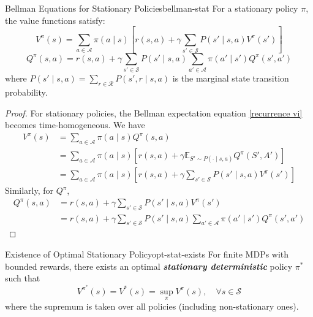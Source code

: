\documentclass[a4paper, 11pt]{article}
\numberwithin{equation}{section}
\theoremstyle{plain}
\theoremstyle{definition}
\newcommand{\E}{{\mathbb E}}
\newcommand{\1}{{\mathbbm 1}}
\newcommand{\mc}[1]{\mathcal{#1}}
\newcommand{\bi}[1]{\textbf{\textit{#1}}}
\begin{document}
	\begin{fprop}{Bellman Equations for Stationary Policies}{bellman-stat}
		For a stationary policy $\pi$, the value functions satisfy:
		\begin{equation}\label{bellman-v-stat}
			V^{\pi}(s) = \sum_{a \in \mc{A}} \pi(a\;|\; s) \left[ r(s, a) + \gamma \sum_{s' \in \mc{S}} P(s'\;|\; s, a) V^{\pi}(s') \right]
		\end{equation}
		\begin{equation}\label{bellman-q-stat}
			Q^{\pi}(s, a) = r(s, a) + \gamma \sum_{s' \in \mc{S}} P(s'\;|\; s, a) \sum_{a' \in \mc{A}} \pi(a'\;|\; s') Q^{\pi}(s', a')
		\end{equation}
		where $P(s'\;|\; s, a) = \sum_{r \in \mc{R}} P(s', r\;|\; s, a)$ is the marginal state transition probability.
	\end{fprop}
	
	\begin{proof}
		For stationary policies, the Bellman expectation equation \eqref{recurrence vi} becomes time-homogeneous. We have
		\begin{equation*}
			\begin{split}
				V^{\pi}(s) &= \sum_{a \in \mc{A}} \pi(a\;|\; s) Q^{\pi}(s, a)\\
				&= \sum_{a \in \mc{A}} \pi(a\;|\; s) \left[ r(s, a) + \gamma \E_{S' \sim P(\cdot\;|\; s, a)} Q^{\pi}(S', A') \right]\\
				&= \sum_{a \in \mc{A}} \pi(a\;|\; s) \left[ r(s, a) + \gamma \sum_{s' \in \mc{S}} P(s'\;|\; s, a) V^{\pi}(s') \right]
			\end{split}
		\end{equation*}
		Similarly, for $Q^{\pi}$,
		\begin{equation*}
			\begin{split}
				Q^{\pi}(s, a) &= r(s, a) + \gamma \sum_{s' \in \mc{S}} P(s'\;|\; s, a) V^{\pi}(s')\\
				&= r(s, a) + \gamma \sum_{s' \in \mc{S}} P(s'\;|\; s, a) \sum_{a' \in \mc{A}} \pi(a'\;|\; s') Q^{\pi}(s', a')
			\end{split}
		\end{equation*}
	\end{proof}
	
	\begin{ftheo}{Existence of Optimal Stationary Policy}{opt-stat-exists}
		For finite MDPs with bounded rewards, there exists an optimal \bi{stationary deterministic} policy $\pi^*$ such that
		\begin{equation}
			V^{\pi^*}(s) = V^{*}(s) = \sup_{\pi} V^{\pi}(s), \quad \forall s \in \mc{S}
		\end{equation}
		where the supremum is taken over all policies (including non-stationary ones).
	\end{ftheo}
	
\end{document}

